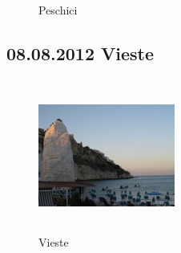 \begin{figure}[h]
   \centering
   \quad
   \quad
   \quad
   \caption[Peschici]{Peschici}
\end{figure}

\subsection{08.08.2012 Vieste}

\begin{figure} 
  \begin{centering}
    \includegraphics[width=0.4\textwidth, height=5cm, keepaspectratio]{../Bilder/Sommer2012/22.jpg}
    \caption{Vieste}
  \end{centering}
\end{figure} 

